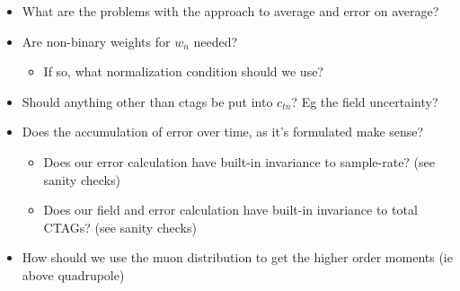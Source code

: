 \documentclass[twoside]{article}
\begin{document}
\begin{itemize}
	\item What are the problems with the approach to average and error on average?
	\item Are non-binary weights for $w_n$ needed?
	\begin{itemize}
		\item If so, what normalization condition should we use? 
	\end{itemize}
	\item Should anything other than ctags be put into $c_{tn}$? Eg the field uncertainty?
	\item Does the accumulation of error over time, as it's formulated make sense?
		\begin{itemize}
		\item Does our error calculation have built-in invariance to sample-rate? (see sanity checks)
		\item Does our field and error calculation have built-in invariance to total CTAGs? (see sanity checks)
		
	\end{itemize}
	\item How should we use the muon distribution to get the higher order moments (ie above quadrupole)
	
\end{itemize}
\end{document}
